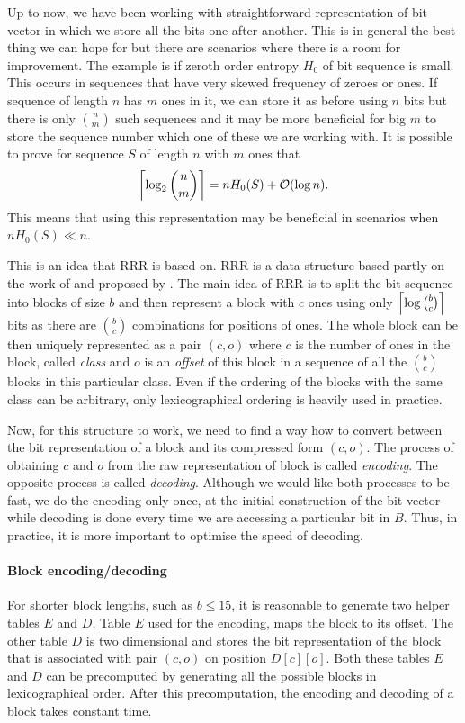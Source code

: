 Up to now, we have been working with straightforward representation of bit vector in which we store
all the bits one after another. This is in general the best thing we can hope for but there are scenarios
where there is a room for improvement. The example is if zeroth order entropy $H_0$ of bit sequence
is small. This occurs in sequences that have very skewed frequency of zeroes or ones. If sequence of
length $n$ has $m$ ones in it, we can store it as before using $n$ bits but there is only ${n \choose m}$
such sequences and it may be more beneficial for big $m$ to store the sequence number which one of these
we are working with. It is possible to prove for sequence $S$ of length $n$ with $m$ ones that
$$\left\lceil \log_2 {n \choose m} \right\rceil = nH_0(S)+\mathcal{O}(\log n).$$ This means that using this representation may be
beneficial in scenarios when $nH_0(S)\ll n$.

This is an idea that RRR is based on. RRR is a data structure based partly on the work of \cite{pagh2001low}
and proposed by \cite{raman2007succinct}. The main idea of RRR is to split the bit sequence into blocks of size
$b$ and then represent a block with $c$ ones using only $\left\lceil \log {b \choose c} \right\rceil$ bits as
there are ${b \choose c}$ combinations for positions of ones. The whole block can be then uniquely
represented as a pair $(c, o)$ where $c$ is the number of ones in the block, called \emph{class} and
$o$ is an \emph{offset} of this block in a sequence of all the ${b \choose c}$ blocks in this particular class.
Even if the ordering of the blocks with the same class can be arbitrary, only lexicographical ordering
is heavily used in practice.

Now, for this structure to work, we need to find a way how to convert between the bit representation of
a block and its compressed form $(c, o)$. The process of obtaining $c$ and $o$ from the raw representation
of block is called \textit{encoding}. The opposite process is called \textit{decoding}. Although
we would like both processes to be fast, we do the encoding only once, at the initial construction
of the bit vector while decoding is done every time we are accessing a particular bit in $B$. Thus,
in practice, it is more important to optimise the speed of decoding.

\paragraph{Block encoding/decoding}

For shorter block lengths, such as $b\leq 15$, it is reasonable to generate two helper tables $E$ and $D$.
Table $E$ used for the encoding, maps the block to its offset. The other table $D$ is two dimensional and
stores the bit representation of the block that is associated with pair $(c, o)$ on position $D[c][o]$.
Both these tables $E$ and $D$ can be precomputed by generating all the possible blocks in lexicographical
order. After this precomputation, the encoding and decoding of a block takes constant time.

